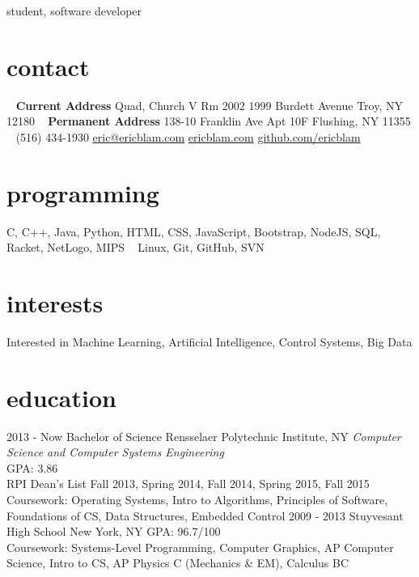 \documentclass[]{friggeri-cv}
\begin{document}
       {student, software developer}


\begin{aside}
  \section{contact}
    ~
    \textbf{Current Address}
    Quad, Church V
    Rm 2002
    1999 Burdett Avenue
    Troy, NY 12180
    ~
    \textbf{Permanent Address}
    138-10 Franklin Ave
    Apt 10F
    Flushing, NY 11355
    ~
    (516) 434-1930
    \href{mailto:adrien@friggeri.net}{eric@ericblam.com}
    \href{http://ericblam.com}{ericblam.com}
    \href{http://github.com/ericblam}{github.com/ericblam}
  \section{programming}
    C, C++, Java, Python, HTML, CSS, JavaScript, Bootstrap, NodeJS, SQL, Racket, NetLogo, MIPS
    ~
    Linux, Git, GitHub, SVN
\end{aside}

\section{interests}

Interested in Machine Learning, Artificial Intelligence, Control Systems, Big Data

\section{education}

\begin{entrylist}
  \entry
    {2013 - Now}
    {Bachelor of Science}
    {Rensselaer Polytechnic Institute, NY}
    {\emph{Computer Science and Computer Systems Engineering}\\
    GPA: 3.86\\
    RPI Dean's List Fall 2013, Spring 2014, Fall 2014, Spring 2015, Fall 2015\\
    Coursework: Operating Systems, Intro to Algorithms, Principles of Software, Foundations of CS, Data Structures, Embedded Control}
  \entry
    {2009 - 2013}
    {Stuyvesant High School}
    {New York, NY}
    {GPA: 96.7/100\\
    Coursework: Systems-Level Programming, Computer Graphics, AP Computer Science, Intro to CS, AP Physics C (Mechanics \& EM), Calculus BC}
\end{entrylist}
\end{document}
